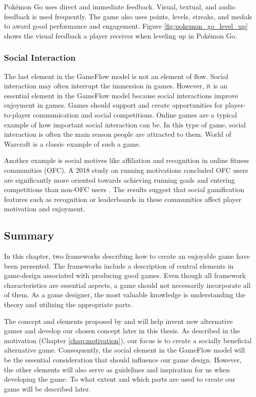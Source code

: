 Pokémon Go uses direct and immediate feedback. Visual, textual, and audio feedback is used frequently. The game also uses points, levels, streaks, and medals to award good performance and engagement. Figure \ref{fig:pokemon_go_level_up} shows the visual feedback a player receives when leveling up in Pokémon Go.

\subsubsection{Social Interaction}
The last element in the GameFlow model is not an element of flow. Social interaction may often interrupt the immersion in games. However, it is an essential element in the GameFlow model because social interactions improve enjoyment in games. Games should support and create opportunities for player-to-player communication and social competitions. Online games are a typical example of how important social interaction can be. In this type of game, social interaction is often the main reason people are attracted to them. World of Warcraft is a classic example of such a game. 

Another example is social motives like affiliation and recognition in online fitness communities (OFC). A 2018 study on running motivations concluded OFC users are significantly more oriented towards achieving running goals and entering competitions than non-OFC users \citep{stragier_recreational_2018}. The results suggest that social gamification features such as recognition or leaderboards in these communities affect player motivation and enjoyment.

\subsection{Summary}
In this chapter, two frameworks describing how to create an enjoyable game have been presented. The frameworks include a description of central elements in game-design associated with producing good games. Even though all framework characteristics are essential aspects, a game should not necessarily incorporate all of them. As a game designer, the most valuable knowledge is understanding the theory and utilizing the appropriate parts.

The concept and elements proposed by \citeauthor{malone_what_1980} and \citeauthor{sweetser_gameflow_2005} will help invent new alternative games and develop our chosen concept later in this thesis. As described in the motivation (Chapter \ref{chap:motivation}), our focus is to create a socially beneficial alternative game. Consequently, the social element in the GameFlow model will be the essential consideration that should influence our game design. However, the other elements will also serve as guidelines and inspiration for us when developing the game. To what extent and which parts are used to create our game will be described later.
